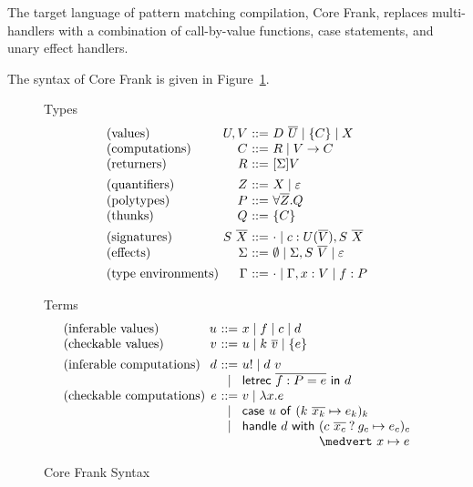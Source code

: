 \documentclass[preprint]{sigplanconf}
\makeatletter
\newcommand{\many}{\overline}
\newcommand\ba{\begin{array}}
\newcommand\ea{\end{array}}
\newcommand{\bstack}{\begin{array}[t]{@{}l@{}}}
\newcommand{\estack}{\end{array}}
\newenvironment{syntax}{\[\ba{@{}l@{~}r@{~}c@{~}l@{}}}{\ea\]}
\newcommand{\sig}{S}
\newcommand{\sigs}{\Sigma}
\newcommand{\effbox}[1]{[#1]}
\newcommand{\key}[1]{\mathsf{#1}}
\newcommand{\handleSymbol}{\mathbin{?}}
\newcommand{\handle}[2]{{#1} \handleSymbol {#2}}
\newcommand{\thunk}[1]{\{{#1}\}}
\newcommand{\force}[1]{{#1}!}
\newcommand\slab[1]{(\textrm{#1})}
\makeatother
\begin{document}
The target language of pattern matching compilation, Core Frank,
replaces multi-handlers with a combination of call-by-value functions,
case statements, and unary effect handlers.

The syntax of Core Frank is given in Figure~\ref{fig:core-syntax}.
%
\begin{figure}
Types
\begin{syntax}
\slab{values}       &U, V          &::=& D~\many{U} \mid \thunk{C} \mid X \\
\slab{computations} &C             &::=& R \mid V \to C \\
\slab{returners}    &R             &::=& \effbox{\sigs}V
\\[1ex]
\slab{quantifiers}  &Z             &::=& X \mid \varepsilon \\
\slab{polytypes}    &P             &::=& \forall \many{Z}.Q \\
\slab{thunks}       &Q             &::=& \thunk{C}
\\[1ex]
\slab{signatures}   &\sig~\many{X} &::=& \cdot \mid c : U(\many{V}), \sig~\many{X} \\
\slab{effects}      &\sigs         &::=&
  \emptyset \mid \sigs, \sig~\many{V} \mid \varepsilon
\\[1ex]
\slab{type environments}
                    &\Gamma        &::=& \cdot \mid \Gamma, x:V \mid f:P \\
\end{syntax}

Terms
\begin{syntax}
\slab{inferable values}&u       &::=& x \mid f \mid c \mid d \\
\slab{checkable values}&v       &::=& u \mid k~\many{v} \mid \thunk{e}
\\[1ex]
\slab{inferable computations}&d &::=& \force{u} \mid d~v \\
                             &&\mid& \key{letrec}~\many{f : P = e}~\key{in}~d \\
\slab{checkable computations} &e  &::= & v \mid \lambda x.e \\
   &&\mid& \key{case}~u~\key{of}~
             (k~\many{x_k} \mapsto e_k)_k \\
   &&\mid& \key{handle}~d~\key{with}~
             \bstack
             (\handle{c~\many{x_c}}{g_c} \mapsto e_c)_c \\
             \medvert~ x        \mapsto e \\
             \estack \\
\end{syntax}
\caption{Core Frank Syntax}
\label{fig:core-syntax}
\end{figure}
\end{document}
